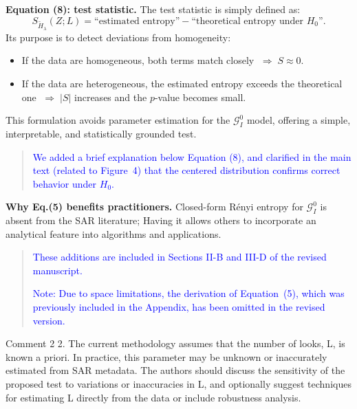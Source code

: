 \documentclass[11pt]{report}
\begin{document}
\begin{responsebox}{}
\vspace{0.5em}
\textbf{Equation (8): test statistic.}  
The test statistic is simply defined as:
\[
S_{\widetilde H_\lambda}(Z;L)
= \text{“estimated entropy”} - \text{“theoretical entropy under } H_0\text{”}.
\]
Its purpose is to detect deviations from homogeneity:
\begin{itemize}
	\item  If the data are homogeneous, both terms match closely $\;\Rightarrow\;S\approx0$.
	\item  If the data are heterogeneous, the estimated entropy exceeds the theoretical one $\;\Rightarrow\;|S|$ increases and the $p$-value becomes small.
\end{itemize}

This formulation avoids parameter estimation for the $\mathcal{G}^0_I$ model, offering a simple, interpretable, and statistically grounded test.

\begin{quote}
\textcolor{blue}{We added a brief explanation below Equation (8), and clarified in the main text (related to Figure~4) that the centered distribution confirms correct behavior under $H_0$.}

\end{quote}


\textbf{Why Eq.(5) benefits practitioners.}  
Closed-form Rényi entropy for $\mathcal{G}^{0}_{\!I}$ is absent from the SAR literature; Having it allows others to incorporate an analytical feature into algorithms and applications.
\begin{quote}
\textcolor{blue}{These additions are included in Sections II-B and III-D of the revised manuscript.}


\textcolor{blue}{Note: Due to space limitations, the derivation of Equation~(5), which was previously included in the Appendix, has been omitted in the revised version.}
\end{quote}
\end{responsebox}


\vspace{1em}
\begin{reviewbox}{Comment 2}
2. The current methodology assumes that the number of looks, L, is known a priori. In practice, this parameter may be unknown or inaccurately estimated from SAR metadata. The authors should discuss the sensitivity of the proposed test to variations or inaccuracies in L, and optionally suggest techniques for estimating L directly from the data or include robustness analysis. 
\end{reviewbox}
\end{document}
